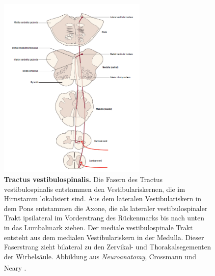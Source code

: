 \begin{figure}[H]
    \centering
    \includegraphics[width=0.65\textwidth]{pictures/Bilder_Laura/vestibulospinal_tract.PNG}
    \caption[Tractus vestibulospinalis]{\textbf{Tractus vestibulospinalis.} Die Fasern des Tractus vestibulospinalis entstammen den Vestibulariskernen, die im Hirnstamm lokalisiert sind. Aus dem lateralen Vestibulariskern in dem Pons entstammen die Axone, die als lateraler vestibulospinaler Trakt ipsilateral im Vorderstrang des Rückenmarks bis nach unten in das Lumbalmark ziehen. Der mediale vestibulospinale Trakt entsteht aus dem medialen Vestibulariskern in der Medulla. Dieser Faserstrang zieht bilateral zu den Zervikal- und Thorakalsegementen der Wirbelsäule. Abbildung aus \textit{Neuroanatomy}, Crossmann und Neary \textsuperscript{\cite[8]{crossman2014neuroanatomy}}.}
    \label{fig:tr_vestibulospinalis}
\end{figure}

